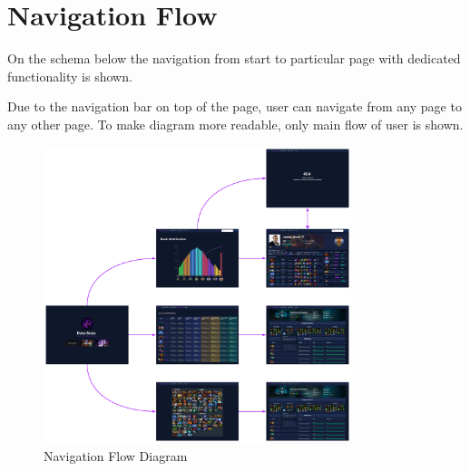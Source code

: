 \section{Navigation Flow}

On the schema below the navigation from start to particular page with dedicated functionality is shown.

\vspace{1em}
Due to the navigation bar on top of the page, user can navigate from any page to any other page.
To make diagram more readable, only main flow of user is shown.

\begin{figure}[ht]
    \centering
    \includegraphics[width=0.8\textwidth]{images/Navigation}
    \caption{Navigation Flow Diagram}
\end{figure}